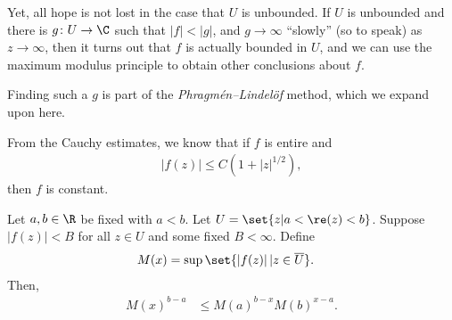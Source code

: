 \documentclass[10pt]{mypackage}
\begin{document}
Yet, all hope is not lost in the case that $U$ is unbounded. If $U$ is unbounded and there is $g\colon U\rightarrow \C$  such that $\left\vert f \right\vert < \left\vert g \right\vert$, and $g\rightarrow\infty$ ``slowly'' (so to speak) as $z\rightarrow\infty$, then it turns out that $f$ is actually bounded in $U$, and we can use the maximum modulus principle to obtain other conclusions about $f$.\newline

Finding such a $g$ is part of the \textit{Phragmén--Lindelöf} method, which we expand upon here.
\begin{example}
  From the Cauchy estimates, we know that if $f$ is entire and
  \begin{align*}
    \left\vert f(z) \right\vert \leq C\left( 1 + \left\vert z \right\vert^{1/2} \right),
  \end{align*}
  then $f$ is constant.
\end{example}
\begin{theorem}
  Let $a,b\in \R$ be fixed with $ a < b $. Let $U = \set{z | a < \re(z) < b}$. Suppose $\left\vert f(z) \right\vert < B$ for all $z\in U$ and some fixed $B < \infty$. Define
  \begin{align*}
    M(x) &= \sup\set{\left\vert f(z) \right\vert | z\in \overline{U}}.
  \end{align*}
  Then,
  \begin{align*}
    M(x)^{b-a} &\leq M(a)^{b-x}M(b)^{x-a}.
  \end{align*}
\end{theorem}
\end{document}
